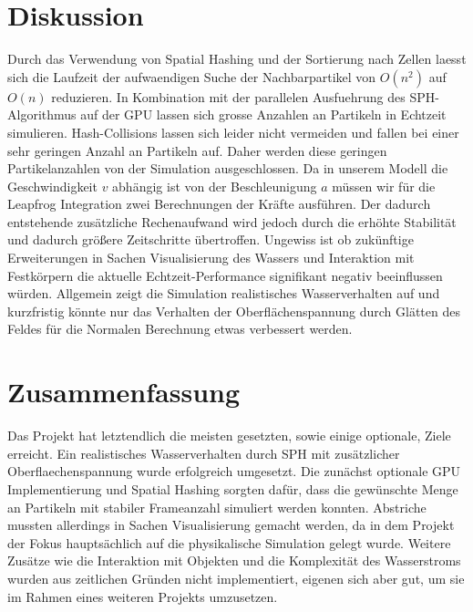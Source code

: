 \documentclass[a4paper]{paper}
\begin{document}
\section{Diskussion}
Durch das Verwendung von Spatial Hashing und der Sortierung nach Zellen laesst sich die Laufzeit der aufwaendigen Suche der Nachbarpartikel von $O(n^2)$ auf $O(n)$ reduzieren.
In Kombination mit der parallelen Ausfuehrung des SPH-Algorithmus auf der GPU lassen sich grosse Anzahlen an Partikeln in Echtzeit simulieren.
Hash-Collisions lassen sich leider nicht vermeiden und fallen bei einer sehr geringen Anzahl an Partikeln auf. Daher werden diese geringen Partikelanzahlen von der Simulation ausgeschlossen.
Da in unserem Modell die Geschwindigkeit $v$ abhängig ist von der Beschleunigung $a$ müssen wir für die Leapfrog Integration zwei Berechnungen der Kräfte ausführen. Der dadurch entstehende zusätzliche Rechenaufwand wird jedoch durch die erhöhte Stabilität und dadurch größere Zeitschritte übertroffen. 
Ungewiss ist ob zukünftige Erweiterungen in Sachen Visualisierung des Wassers und Interaktion mit Festkörpern die aktuelle Echtzeit-Performance signifikant negativ beeinflussen würden.
Allgemein zeigt die Simulation realistisches Wasserverhalten auf und kurzfristig könnte nur das Verhalten der Oberflächenspannung durch Glätten des Feldes für die Normalen Berechnung etwas verbessert werden.

\section{Zusammenfassung}

Das Projekt hat letztendlich die meisten gesetzten, sowie einige optionale, Ziele erreicht. Ein realistisches Wasserverhalten durch SPH mit zusätzlicher Oberflaechenspannung wurde erfolgreich umgesetzt. Die zunächst optionale GPU Implementierung und Spatial Hashing sorgten dafür, dass die gewünschte Menge an Partikeln mit stabiler Frameanzahl simuliert werden konnten. Abstriche mussten allerdings in Sachen Visualisierung gemacht werden, da in dem Projekt der Fokus hauptsächlich auf die physikalische Simulation gelegt wurde. Weitere Zusätze wie die Interaktion mit Objekten und die Komplexität des Wasserstroms wurden aus zeitlichen Gründen nicht implementiert, eigenen sich aber gut, um sie im Rahmen eines weiteren Projekts umzusetzen.

\end{document}
